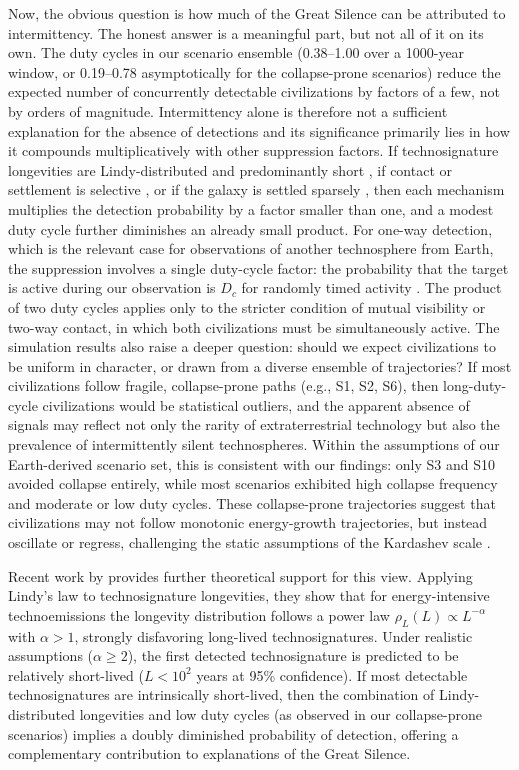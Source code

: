 Now, the obvious question is how much of the Great Silence can be attributed to intermittency. The honest answer is a meaningful part, but not all of it on its own. The duty cycles in our scenario ensemble (0.38--1.00 over a 1000-year window, or 0.19--0.78 asymptotically for the collapse-prone scenarios) reduce the expected number of concurrently detectable civilizations by factors of a few, not by orders of magnitude. Intermittency alone is therefore not a sufficient explanation for the absence of detections and its significance primarily lies in how it compounds multiplicatively with other suppression factors. If technosignature longevities are Lindy-distributed and predominantly short \citep{Balbi2024-bg}, if contact or settlement is selective \citep{Wandel2022-fp}, or if the galaxy is settled sparsely \citep{Carroll-Nellenback2019-aurora}, then each mechanism multiplies the detection probability by a factor smaller than one, and a modest duty cycle further diminishes an already small product. For one-way detection, which is the relevant case for observations of another technosphere from Earth, the suppression involves a single duty-cycle factor: the probability that the target is active during our observation is $D_c$ for randomly timed activity \citep{Balbi2018-fp}. The product of two duty cycles applies only to the stricter condition of mutual visibility or two-way contact, in which both civilizations must be simultaneously active. The simulation results also raise a deeper question: should we expect civilizations to be uniform in character, or drawn from a diverse ensemble of trajectories? If most civilizations follow fragile, collapse-prone paths (e.g., S1, S2, S6), then long-duty-cycle civilizations would be statistical outliers, and the apparent absence of signals may reflect not only the rarity of extraterrestrial technology but also the prevalence of intermittently silent technospheres. Within the assumptions of our Earth-derived scenario set, this is consistent with our findings: only S3 and S10 avoided collapse entirely, while most scenarios exhibited high collapse frequency and moderate or low duty cycles. These collapse-prone trajectories suggest that civilizations may not follow monotonic energy-growth trajectories, but instead oscillate or regress, challenging the static assumptions of the Kardashev scale \citep{Kardashev1964-gv}.

Recent work by \citet{Balbi2024-bg} provides further theoretical support for this view. Applying Lindy's law to technosignature longevities, they show that for energy-intensive technoemissions the longevity distribution follows a power law $\rho_L(L) \propto L^{-\alpha}$ with $\alpha > 1$, strongly disfavoring long-lived technosignatures. Under realistic assumptions ($\alpha \geq 2$), the first detected technosignature is predicted to be relatively short-lived ($L < 10^2$ years at 95\% confidence). If most detectable technosignatures are intrinsically short-lived, then the combination of Lindy-distributed longevities and low duty cycles (as observed in our collapse-prone scenarios) implies a doubly diminished probability of detection, offering a complementary contribution to explanations of the Great Silence.

